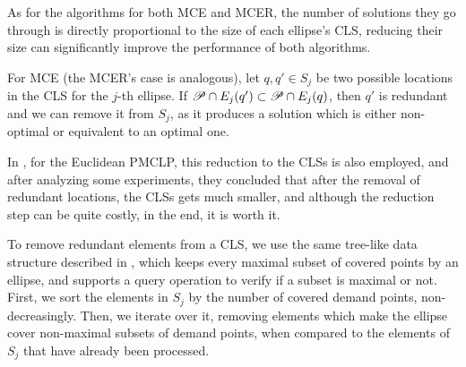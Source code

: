As for the algorithms for both MCE and MCER, the number of solutions they go through is directly proportional to the size of each ellipse's CLS, reducing their size can significantly improve the performance of both algorithms.

For MCE (the MCER's case is analogous), let $q, q' \in S_j$ be two possible locations in the CLS for the $j$-th ellipse. If $\mathscr{P} \cap E_j(q') \subset \mathscr{P} \cap E_j(q)$, then $q'$ is redundant and we can remove it from $S_j$, as it produces a solution which is either non-optimal or equivalent to an optimal one. 

In \cite{church:1984}, for the Euclidean PMCLP, this reduction to the CLSs is also employed, and after analyzing some experiments, they concluded that after the removal of redundant locations, the CLSs gets much smaller, and although the reduction step can be quite costly, in the end, it is worth it.

To remove redundant elements from a CLS, we use the same tree-like data structure described in \cite{andreta}, which keeps every maximal subset of covered points by an ellipse, and supports a query operation to verify if a subset is maximal or not.
First, we sort the elements in $S_j$ by the number of covered demand points, non-decreasingly. Then, we iterate over it, removing elements which make the ellipse cover non-maximal subsets of demand points, when compared to the elements of $S_j$ that have already been processed.
